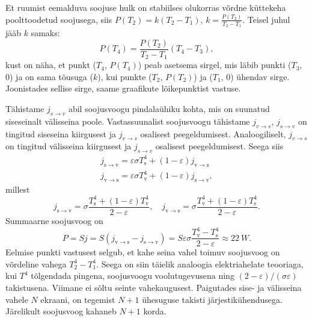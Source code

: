 \documentclass[10pt]{article}
\begin{document}
{
\solu
Et ruumist eemalduva soojuse hulk on stabiilses olukorras võrdne küttekeha poolttoodetud soojusega, siis $P(T_2) = k(T_2 - T_1)$, $k = \frac{P(T_2)}{T_2-T_1}$. Teisel juhul jääb $k$ samaks:
\[
P(T_4) = \frac{P(T_2)}{T_2-T_1} (T_4 - T_3), 
\]
kust on näha, et punkt ($T_4$, $P(T_4)$) peab asetsema sirgel, mis läbib punkti ($T_3$, $0$) ja on sama tõusuga ($k$), kui punkte ($T_2$, $P(T_2)$) ja ($T_1$, $0$) ühendav sirge. Joonistades sellise sirge, saame graafikute lõikepunktist vastuse.
\probend
\bigskip


\solu
\osa Tähistame $j_{s\rightarrow v}$ abil soojusvoogu pindalaühiku kohta, mis on suunatud siseseinalt välisseina poole. Vastassuunalist soojusvoogu tähistame $j_{v\rightarrow s}$, $j_{s\rightarrow v}$ on tingitud siseseina kiirgusest ja $j_{v\rightarrow s}$ osalisest peegeldumisest. Analoogiliselt, $j_{v\rightarrow s}$ on tingitud välisseina kiirgusest ja $j_{s\rightarrow v}$ osalisest peegeldumisest. Seega siis
\[
\begin{aligned}
{j_{\mathrm{s} \rightarrow \mathrm{v}}=\varepsilon \sigma T_{\mathrm{s}}^{4}+(1-\varepsilon) j_{\mathrm{v} \rightarrow \mathrm{s}}} \\ {j_{\mathrm{v} \rightarrow \mathrm{s}}=\varepsilon \sigma T_{\mathrm{v}}^{4}+(1-\varepsilon) j_{\mathrm{s} \rightarrow \mathrm{v}}},
\end{aligned}
\]
millest
\[
j_{\mathrm{s} \rightarrow \mathrm{v}}=\sigma \frac{T_{\mathrm{s}}^{4}+(1-\varepsilon) T_{\mathrm{v}}^{4}}{2-\varepsilon}, \quad j_{\mathrm{v} \rightarrow \mathrm{s}}=\sigma \frac{T_{\mathrm{v}}^{4}+(1-\varepsilon) T_{\mathrm{s}}^{4}}{2-\varepsilon}.
\]
Summaarne soojusvoog on
\[
P=Sj=S\left(j_{\mathrm{v} \rightarrow \mathrm{s}}-j_{\mathrm{s} \rightarrow \mathrm{v}}\right)=S\varepsilon \sigma \frac{T_{\mathrm{v}}^{4}-T_{\mathrm{s}}^{4}}{2-\varepsilon} \approx \SI{22}{W}.
\]
\osa Eelmise punkti vastusest selgub, et kahe seina vahel toimuv soojusvoog on võrdeline vahega $T_{2}^{4}-T_{1}^{4}$. Seega on siin täielik analoogia elektriahelate teooriaga, kui $T^4$ tõlgendada pingena, soojusvoogu voolutugevusena ning $(2-\varepsilon )/(\sigma \varepsilon)$ takistusena. Viimane ei sõltu seinte vahekaugusest. Paigutades sise- ja välisseina vahele $N$ ekraani, on tegemist $N + 1$ ühesuguse takisti järjestikühendusega. Järelikult soojusvoog kahaneb $N + 1$ korda.
\probend
\bigskip

}
\end{document}
